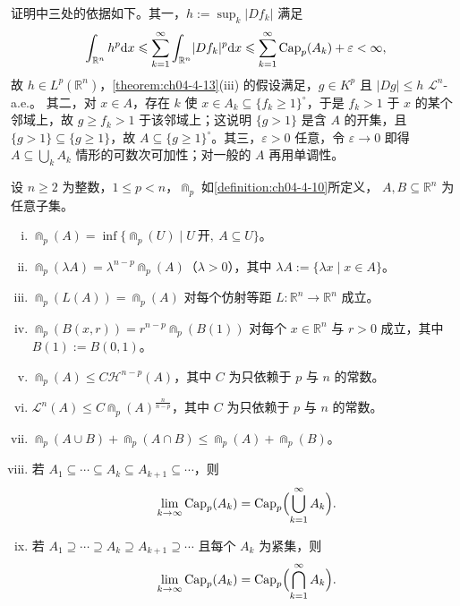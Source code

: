 \documentclass[../../main.tex]{subfiles}%
\begin{document}
\begin{remark}\label{remark:ch04-thm-4-14-补充}
证明中三处的依据如下。其一，$h:=\sup_k\lvert Df_k\rvert$ 满足
\begin{align*}
\int_{\mathbb{R}^n}h^p\diff x\leqslant\sum_{k=1}^{\infty}\int_{\mathbb{R}^n}\lvert Df_k\rvert^p\diff x\leqslant\sum_{k=1}^{\infty}\Cap_p(A_k)+\varepsilon<\infty ,
\end{align*}
故 $h\in L^p(\mathbb{R}^n)$，\cref{theorem:ch04-4-13}(iii) 的假设满足，$g\in K^p$ 且 $\lvert Dg\rvert\leqslant h$ $\mathcal{L}^n$-a.e.。%
其二，对 $x\in A$，存在 $k$ 使 $x\in A_k\subseteq\{f_k\geqslant1\}^{\circ}$，于是 $f_k>1$ 于 $x$ 的某个邻域上，故 $g\geqslant f_k>1$ 于该邻域上；这说明 $\{g>1\}$ 是含 $A$ 的开集，且 $\{g>1\}\subseteq\{g\geqslant1\}$，故 $A\subseteq\{g\geqslant1\}^{\circ}$。其三，$\varepsilon>0$ 任意，令 $\varepsilon\to0$ 即得 $A\subseteq\bigcup_kA_k$ 情形的可数次可加性；对一般的 $A$ 再用单调性。
\end{remark}

\begin{theorem}[容量的性质]\label{theorem:ch04-4-15}
设 $n\geqslant2$ 为整数，$1\leqslant p<n$，$\Cap_p$ 如\cref{definition:ch04-4-10}所定义，%
$A,B\subseteq\mathbb{R}^n$ 为任意子集。
\begin{enumerate}[(i)]
\item $\Cap_p(A)=\inf\{\Cap_p(U)\mid U\ \text{开},\ A\subseteq U\}$。
\item $\Cap_p(\lambda A)=\lambda^{n-p}\Cap_p(A)$（$\lambda>0$），其中 $\lambda A:=\{\lambda x\mid x\in A\}$。
\item $\Cap_p(L(A))=\Cap_p(A)$ 对每个仿射等距 $L:\mathbb{R}^n\to\mathbb{R}^n$ 成立。
\item $\Cap_p(B(x,r))=r^{n-p}\Cap_p(B(1))$ 对每个 $x\in\mathbb{R}^n$ 与 $r>0$ 成立，其中 $B(1):=B(0,1)$。
\item $\Cap_p(A)\leqslant C\mathcal{H}^{n-p}(A)$，其中 $C$ 为只依赖于 $p$ 与 $n$ 的常数。
\item $\mathcal{L}^n(A)\leqslant C\Cap_p(A)^{\frac{n}{n-p}}$，其中 $C$ 为只依赖于 $p$ 与 $n$ 的常数。
\item $\Cap_p(A\cup B)+\Cap_p(A\cap B)\leqslant\Cap_p(A)+\Cap_p(B)$。
\item 若 $A_1\subseteq\cdots\subseteq A_k\subseteq A_{k+1}\subseteq\cdots$，则
\begin{align*}
\lim_{k\to\infty}\Cap_p(A_k)=\Cap_p\Bigl(\bigcup_{k=1}^{\infty}A_k\Bigr).
\end{align*}
\item 若 $A_1\supseteq\cdots\supseteq A_k\supseteq A_{k+1}\supseteq\cdots$ 且每个 $A_k$ 为紧集，则
\begin{align*}
\lim_{k\to\infty}\Cap_p(A_k)=\Cap_p\Bigl(\bigcap_{k=1}^{\infty}A_k\Bigr).
\end{align*}
\end{enumerate}
\end{theorem}
\end{document}
